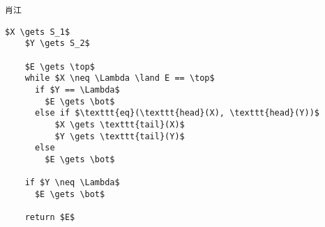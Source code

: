 \begin{frame}[fragile]{}
  \begin{lstlisting}[style = CStyle]
  肖江
  \end{lstlisting}
\end{frame}

\begin{frame}[fragile]{}
  \begin{lstlisting}[style = CStyle]
    $X \gets S_1$
    $Y \gets S_2$

    $E \gets \top$
    while $X \neq \Lambda \land E == \top$
      if $Y == \Lambda$
        $E \gets \bot$
      else if $\texttt{eq}(\texttt{head}(X), \texttt{head}(Y))$
          $X \gets \texttt{tail}(X)$
          $Y \gets \texttt{tail}(Y)$
      else
        $E \gets \bot$

    if $Y \neq \Lambda$
      $E \gets \bot$

    return $E$
  \end{lstlisting}
\end{frame}
